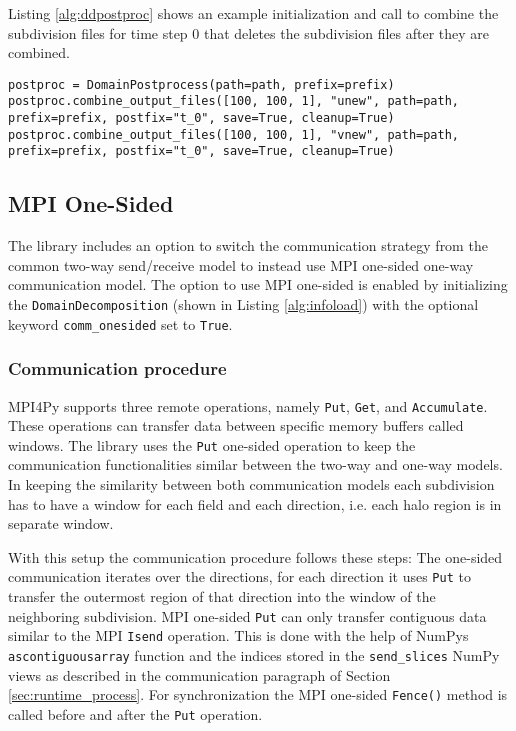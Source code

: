 Listing \ref{alg:ddpostproc} shows an example initialization and call to combine the subdivision files for time step 0 that deletes the subdivision files after they are combined.

\begin{lstlisting}[caption={Example post-processing.}, captionpos=b, label={alg:ddpostproc}, float, floatplacement=H]
postproc = DomainPostprocess(path=path, prefix=prefix)
postproc.combine_output_files([100, 100, 1], "unew", path=path, prefix=prefix, postfix="t_0", save=True, cleanup=True)
postproc.combine_output_files([100, 100, 1], "vnew", path=path, prefix=prefix, postfix="t_0", save=True, cleanup=True)
\end{lstlisting}

\newpage
\subsection{MPI One-Sided}
\label{sec:onesided}
The library includes an option to switch the communication strategy from the common two-way send/receive model to instead use MPI one-sided one-way communication model.
The option to use MPI one-sided is enabled by initializing the \texttt{DomainDecomposition} (shown in Listing \ref{alg:infoload}) with the optional keyword \texttt{comm\_onesided} set to \texttt{True}.

\subsubsection{Communication procedure}
MPI4Py supports three remote operations, namely \texttt{Put}, \texttt{Get}, and \texttt{Accumulate}.
These operations can transfer data between specific memory buffers called windows.
The library uses the \texttt{Put} one-sided operation to keep the communication functionalities similar between the two-way and one-way models.
In keeping the similarity between both communication models each subdivision has to have a window for each field and each direction, i.e. each halo region is in separate window.

With this setup the communication procedure follows these steps: 
The one-sided communication iterates over the directions, for each direction it uses \texttt{Put} to transfer the outermost region of that direction into the window of the neighboring subdivision.
MPI one-sided \texttt{Put} can only transfer contiguous data similar to the MPI \texttt{Isend} operation.
This is done with the help of NumPys \texttt{ascontiguousarray} function and the indices stored in the \texttt{send\_slices} NumPy views as described in the communication paragraph of Section \ref{sec:runtime_process}.
For synchronization the MPI one-sided \texttt{Fence()} method is called before and after the \texttt{Put} operation.

